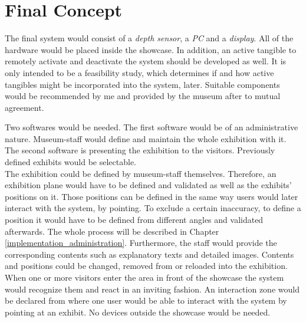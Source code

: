 
\section{Final Concept}
\label{conception_final}


The final system would consist of a \textit{depth sensor}, a \textit{PC} and a \textit{display}. All of the hardware would be placed inside the showcase. In addition, an active tangible to remotely activate and deactivate the system should be developed as well. It is only intended to be a feasibility study, which determines if and how active tangibles might be incorporated into the system, later. Suitable components would be recommended by me and provided by the museum after to mutual agreement.

Two softwares would be needed. The first software would be of an administrative nature. Museum-staff would define and maintain the whole exhibition with it. The second software is presenting the exhibition to the visitors. Previously defined exhibits would be selectable.
\\
The exhibition could be defined by museum-staff themselves. Therefore, an exhibition plane would have to be defined and validated as well as the exhibits' positions on it. Those positions can be defined in the same way users would later interact with the system, by pointing. To exclude a certain inaccuracy, to define a position it would have to be defined from different angles and validated afterwards. The whole process will be described in Chapter \ref{implementation_administration}. Furthermore, the staff would provide the corresponding contents such as explanatory texts and detailed images. Contents and positions could be changed, removed from or reloaded into the exhibition.
\\
When one or more visitors enter the area in front of the showcase the system would recognize them and react in an inviting fashion. An interaction zone would be declared from where one user would be able to interact with the system by pointing at an exhibit. No devices outside the showcase would be needed. 

